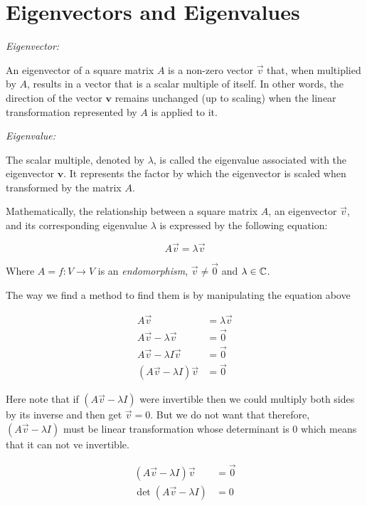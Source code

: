 \newpage
\section{Eigenvectors and Eigenvalues}

\emph{Eigenvector:}

An eigenvector of a square matrix \(A\) is a non-zero vector \(\vec{v}\) that, when multiplied by 
\(A\), results in a vector that is a scalar multiple of itself. In other words, the direction of the 
vector \(\mathbf{v}\) remains unchanged (up to scaling) when the linear transformation represented by 
\(A\) is applied to it.

\emph{Eigenvalue:}

The scalar multiple, denoted by \(\lambda\), is called the eigenvalue associated with the eigenvector 
\(\mathbf{v}\). It represents the factor by which the eigenvector is scaled when transformed by 
the matrix \(A\).

Mathematically, the relationship between a square matrix \(A\), an eigenvector \(\vec{v}\), 
and its corresponding eigenvalue \(\lambda\) is expressed by the following equation:

\[
    A\vec{v} = \lambda\vec{v}
\]

Where \(A = f: V \to V\) is an \emph{endomorphism}, \(\vec{v} \ne \vec{0}\) and  \(\lambda \in \mathbb{C}\).

The way we find a method to find them is by manipulating the equation above

\begin{align*}    
    A\vec{v} &= \lambda\vec{v}\\
    A\vec{v} - \lambda\vec{v} &= \vec{0}\\
    A\vec{v} - \lambda I \vec{v} &= \vec{0}\\
    (A\vec{v} - \lambda I) \vec{v} &= \vec{0}
\end{align*}

Here note that if \((A\vec{v} - \lambda I)\) were invertible then we could multiply both sides by 
its inverse and then get \(\vec{v} = 0\). But we do not want that therefore, \((A\vec{v} - \lambda I)\) 
must be linear transformation whose determinant is \(0\) which means that it can not ve invertible.

\begin{align*}    
    (A\vec{v} - \lambda I) \vec{v} &= \vec{0}\\
    \det (A\vec{v} - \lambda I)  &= 0
\end{align*}

